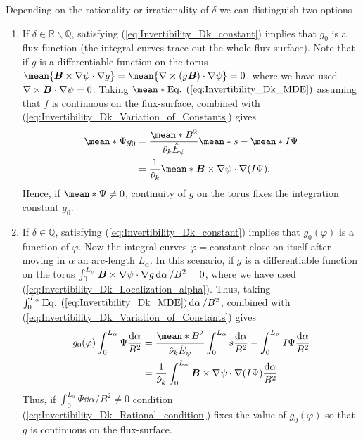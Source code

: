 %
Depending on the rationality or irrationality of $\delta$ we can distinguish two options
%
\begin{enumerate}
	\item If $\delta \in \mathbb{R}\backslash\mathbb{Q}$, satisfying (\ref{eq:Invertibility_Dk_constant}) implies that $g_0$ is a flux-function (the integral curves trace out the whole flux surface). Note that if $g$ is a differentiable function on the torus $\mean{ \vb*{B} \times \nabla \psi \cdot \nabla g } = \mean{ \nabla\times (g\vb*{B}) \cdot\nabla \psi }=0$, where we have used $\nabla\times\vb*{B}\cdot\nabla\psi = 0$. Taking $\mean*{\text{Eq. (\ref{eq:Invertibility_Dk_MDE})}}$ assuming that $f$ is continuous on the flux-surface, combined with (\ref{eq:Invertibility_Dk_Variation_of_Constants}) gives
	\begin{align} 
		\mean*{\Psi} g_0  
		& = 
		\frac{ \mean*{B^2} }{ \hat{\nu}_k \hat{E}_\psi } 
		\mean*{s}
		- 
		\mean*{I \Psi}\nonumber
		\\
		& = 
		\frac{1}{\hat{\nu}_k}
		\mean*{\vb*{B}\times\nabla \psi \cdot \nabla(I \Psi)}. 
		\label{eq:Invertibility_Dk_Ergodic_condition}
	\end{align}
    Hence, if $\mean*{\Psi}\ne 0$, continuity of $g$ on the torus fixes the integration constant $g_0$. 

    \item If $\delta \in \mathbb{Q}$, satisfying (\ref{eq:Invertibility_Dk_constant}) implies that $g_0(\varphi)$ is a function of $\varphi$. Now the integral curves $\varphi=\text{constant}$ close on itself after moving in $\alpha$ an arc-length $L_\alpha$. In this scenario, if $g$ is a differentiable function on the torus $\int_{0}^{L_\alpha}\vb*{B}\times \nabla\psi \cdot \nabla g \dd{\alpha}/ B^2  = 0$, where we have used (\ref{eq:Invertibility_Dk_Localization_alpha}). Thus, taking $\int_{0}^{L_\alpha}\text{Eq. (\ref{eq:Invertibility_Dk_MDE})} \dd{\alpha}/ B^2 $, combined with (\ref{eq:Invertibility_Dk_Variation_of_Constants}) gives
    \begin{align}
      g_0(\varphi) \int_{0}^{L_\alpha} \Psi\frac{\dd{\alpha}}{ B^2 }
      & = 
      \frac{ \mean*{B^2} }{ \hat{\nu}_k \hat{E}_\psi }
      \int_{0}^{L_\alpha} s    \frac{\dd{\alpha}}{ B^2 }
      \nonumber 
-      
      \int_{0}^{L_\alpha}   I \Psi  \frac{\dd{\alpha}}{ B^2 }
      \\
      & =       
      \frac{1}{\hat{\nu}_k}
      \int_{0}^{L_\alpha}
      \vb*{B}\times\nabla \psi \cdot \nabla(I \Psi)
      \frac{\dd{\alpha}}{ B^2 }
      .
      \label{eq:Invertibility_Dk_Rational_condition}
    \end{align}
    Thus, if $\int_{0}^{L_\alpha} \Psi \dd{\alpha} / B^2 \ne 0 $ condition (\ref{eq:Invertibility_Dk_Rational_condition}) fixes the value of $g_0(\varphi)$ so that $g$ is continuous on the flux-surface. 
    
\end{enumerate}
